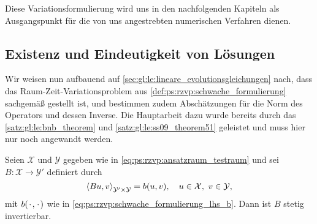 Diese Variationsformulierung wird uns in den nachfolgenden Kapiteln als Ausgangspunkt für die von uns angestrebten numerischen Verfahren dienen.

\subsection{Existenz und Eindeutigkeit von Lösungen} %
\label{sub:ps:eel:existenz_und_eindeutigkeit_von_loesungen}

Wir weisen nun aufbauend auf \cref{sec:gl:le:lineare_evolutionsgleichungen} nach, dass das Raum-Zeit-Variationsproblem aus \cref{def:ps:rzvp:schwache_formulierung} sachgemäß gestellt ist, und bestimmen zudem Abschätzungen für die Norm des Operators und dessen Inverse.
Die Hauptarbeit dazu wurde bereits durch das \cref{satz:gl:le:bnb_theorem} und \cref{satz:gl:le:ss09_theorem51} geleistet und muss hier nur noch angewandt werden.


\begin{Satz}
\label{satz:ps:eel:schwache_formulierung_sachgemaess_gestellt}
    Seien $\mathcal X$ und $\mathcal Y$ gegeben wie in \cref{eq:ps:rzvp:ansatzraum_testraum} und sei $B \colon \mathcal X \to \mathcal Y'$ definiert durch
    \begin{equation}
        \left\langle Bu,v\right\rangle_{\mathcal Y' \times \mathcal Y}  = b(u, v), \quad u \in \mathcal X,~ v \in \mathcal Y,
    \end{equation}
    mit $b({\mkern2mu\cdot\mkern2mu}, {\mkern2mu\cdot\mkern2mu})$ wie in \cref{eq:ps:rzvp:schwache_formulierung_lhs_b}.
    Dann ist $B$ stetig invertierbar.
\end{Satz}

